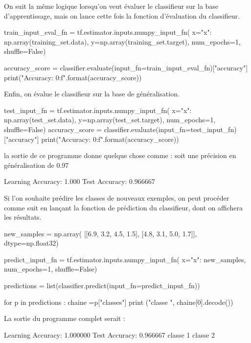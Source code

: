 \documentclass[a4paper,11pt]{book}
\begin{document}
On suit la même logique lorsqu'on veut évaluer le classifieur sur la base d'apprentissage, mais on lance cette fois la fonction d'évaluation du classifieur.
\begin{mypython}
train_input_eval_fn = tf.estimator.inputs.numpy_input_fn(
      x={"x": np.array(training_set.data)},
      y=np.array(training_set.target),
      num_epochs=1,
      shuffle=False)

  
accuracy_score = classifier.evaluate(input_fn=train_input_eval_fn)["accuracy"]
print("\nLearning Accuracy: {0:f}\n".format(accuracy_score))
\end{mypython}

Enfin, on évalue le classifieur sur la base de généralisation.
\begin{mypython}
test_input_fn = tf.estimator.inputs.numpy_input_fn(
      x={"x": np.array(test_set.data)},
      y=np.array(test_set.target),
      num_epochs=1,
      shuffle=False)
accuracy_score = classifier.evaluate(input_fn=test_input_fn)["accuracy"]
print("\nTest Accuracy: {0:f}\n".format(accuracy_score))
\end{mypython}

 
la sortie de ce programme donne quelque chose comme : soit une précision en généralisation de 0.97%
\begin{myoutput}
Learning Accuracy: 1.000
Test Accuracy: 0.966667
\end{myoutput}


Si l'on souhaite prédire les classes de nouveaux exemples, on peut procéder comme suit en lançant la fonction de prédiction du classifieur, dont on affichera les résultats.

\begin{mypython}
new_samples = np.array(
      [[6.9, 3.2, 4.5, 1.5],
       [4.8, 3.1, 5.0, 1.7]], dtype=np.float32)

predict_input_fn = tf.estimator.inputs.numpy_input_fn(
      x={"x": new_samples},
      num_epochs=1,
      shuffle=False)

predictions = list(classifier.predict(input_fn=predict_input_fn))
  
for p in predictions :
    chaine =p["classes"]
    print ("classe ", chaine[0].decode()) 

\end{mypython}

La sortie du programme complet serait :
\begin{myoutput}
Learning Accuracy: 1.000000
Test Accuracy: 0.966667
classe  1
classe  2
\end{myoutput}
\end{document}
